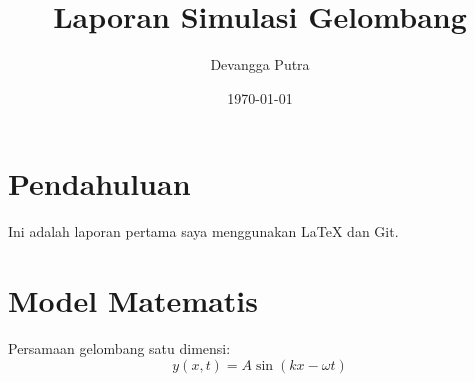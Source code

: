 \documentclass[a4paper,12pt]{article}
\title{Laporan Simulasi Gelombang}
\author{Devangga Putra}
\date{\today}
\begin{document}
\maketitle

\section{Pendahuluan}
Ini adalah laporan pertama saya menggunakan \LaTeX{} dan Git.

\section{Model Matematis}
Persamaan gelombang satu dimensi:
\[
y(x,t) = A \sin(kx - \omega t)
\]
\end{document}
